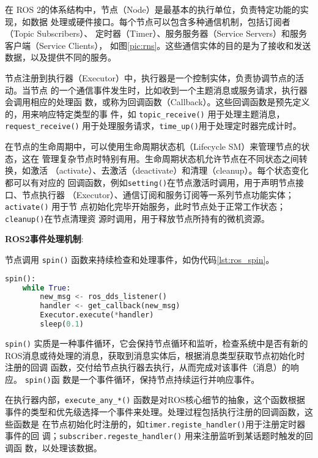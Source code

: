 
在 ROS 2的体系结构中，节点（Node）是最基本的执行单位，负责特定功能的实现，如数据
处理或硬件接口。每个节点可以包含多种通信机制，包括订阅者（Topic Subscribers）、
定时器（Timer）、服务服务器（Service Servers）和服务客户端（Service Clients），
如图\ref{pic:rns}。这些通信实体的目的是为了接收和发送数据，以及提供不同的服务。

节点注册到执行器（Executor）中，执行器是一个控制实体，负责协调节点的活动。当节点
的一个通信事件发生时，比如收到一个主题消息或服务请求，执行器会调用相应的处理函
数，或称为回调函数（Callback）。这些回调函数是预先定义的，用来响应特定类型的事
件，如 \texttt{topic\_receive()} 用于处理主题消息， \texttt{request\_receive()}
用于处理服务请求，\texttt{time\_up()}用于处理定时器完成计时。

在节点的生命周期中，可以使用生命周期状态机（Lifecycle SM）来管理节点的状态，这在
管理复杂节点时特别有用。生命周期状态机允许节点在不同状态之间转换，如激活
（activate）、去激活（deactivate）和清理（cleanup）。每个状态变化都可以有对应的
回调函数，例如\texttt{setting()}在节点激活时调用，用于声明节点接口、节点执行器
（Executor）、通信订阅和服务订阅等一系列节点功能实体；\texttt{activate()} 用于节
点初始化完毕开始服务，此时节点处于正常工作状态； \texttt{cleanup()}在节点清理资
源时调用，用于释放节点所持有的微机资源。

\textbf{ROS2事件处理机制}: 

节点调用 \texttt{spin()} 函数来持续检查和处理事件，如伪代码\ref{lst:ros_spin}。

\begin{lstlisting}[language=Python, caption=ROS2事件循环示例, label=lst:ros_spin]
spin():
    while True:
        new_msg <- ros_dds_listener()
        handler <- get_callback(new_msg)
        Executor.execute(*handler)
        sleep(0.1)
\end{lstlisting}

\texttt{spin()} 实质是一种事件循环，它会保持节点循环和监听，检查系统中是否有新的
ROS消息或待处理的消息，获取到消息实体后，根据消息类型获取节点初始化时注册的回调
函数，交付给节点执行器去执行，从而完成对该事件（消息）的响应。 \texttt{spin()}函
数是一个事件循环，保持节点持续运行并响应事件。

在执行器内部，\texttt{execute\_any\_*()} 函数是对ROS核心细节的抽象，这个函数根据
事件的类型和优先级选择一个事件来处理。处理过程包括执行注册的回调函数，这些函数是
在节点初始化时注册的，如\texttt{timer.registe\_handler()}用于注册定时器事件的回
调；\texttt{subscriber.regeste\_handler()} 用来注册监听到某话题时触发的回调函
数，以处理该数据。

